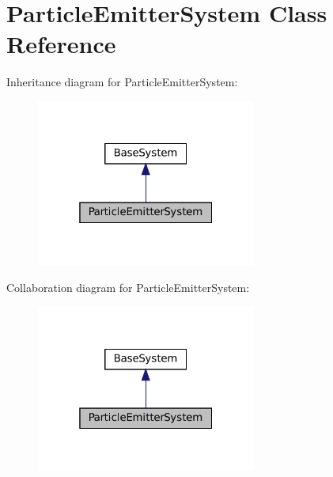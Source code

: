 \hypertarget{classParticleEmitterSystem}{}\section{Particle\+Emitter\+System Class Reference}
\label{classParticleEmitterSystem}


Inheritance diagram for Particle\+Emitter\+System\+:\nopagebreak
\begin{figure}[H]
\begin{center}
\leavevmode
\includegraphics[width=205pt]{classParticleEmitterSystem__inherit__graph}
\end{center}
\end{figure}


Collaboration diagram for Particle\+Emitter\+System\+:\nopagebreak
\begin{figure}[H]
\begin{center}
\leavevmode
\includegraphics[width=205pt]{classParticleEmitterSystem__coll__graph}
\end{center}
\end{figure}
